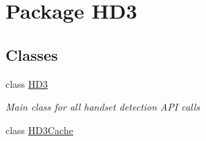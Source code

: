 \hypertarget{namespace_h_d3}{\section{Package H\+D3}
\label{namespace_h_d3}
}
\subsection*{Classes}
\begin{DoxyCompactItemize}
\item 
class \hyperlink{class_h_d3_1_1_h_d3}{H\+D3}
\begin{DoxyCompactList}\small\item\em Main class for all handset detection A\+P\+I calls \end{DoxyCompactList}\item 
class \hyperlink{class_h_d3_1_1_h_d3_cache}{H\+D3\+Cache}
\end{DoxyCompactItemize}
